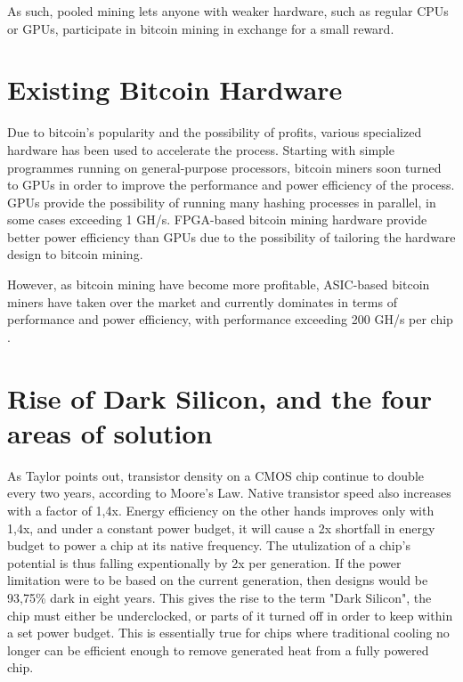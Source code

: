 As such, pooled mining lets anyone with weaker hardware, such as regular CPUs or GPUs, participate
in bitcoin mining in exchange for a small reward.

\section{Existing Bitcoin Hardware}

Due to bitcoin's popularity and the possibility of profits, various specialized hardware has been used
to accelerate the process. Starting with simple programmes running on general-purpose processors,
bitcoin miners soon turned to GPUs in order to improve the performance and power efficiency of the
process. GPUs provide the possibility of running many hashing processes in parallel, in some cases
exceeding 1 GH/s\cite{bitcoin-hardware-cmp}. FPGA-based bitcoin mining hardware provide
better power efficiency than GPUs due to the possibility of tailoring the hardware design to
bitcoin mining.

However, as bitcoin mining have become more profitable, ASIC-based bitcoin miners have taken over
the market and currently dominates in terms of performance and power efficiency, with performance
exceeding 200 GH/s
per chip \cite{bespoke-silicon}.

\section{Rise of Dark Silicon, and the four areas of solution}
\label{sec:dark-silicon}
As Taylor\cite{dark-silicon} points out, transistor density on a CMOS chip continue to double every two years, according to Moore's Law.
Native transistor speed also increases with a factor of 1,4x.
Energy efficiency on the other hands improves only with 1,4x, and under a constant power budget, it will cause a 2x shortfall in energy budget to power a chip at its native frequency.
The utulization of a chip's potential is thus falling expentionally by 2x per generation.
If the power limitation were to be based on the current generation, then designs would be 93,75\% dark in eight years.
This gives the rise to the term "Dark Silicon", the chip must either be underclocked, or parts of it turned off in order to keep within a set power budget.
This is essentially true for chips where  traditional cooling no longer can be efficient enough to remove generated heat from a fully powered chip.

